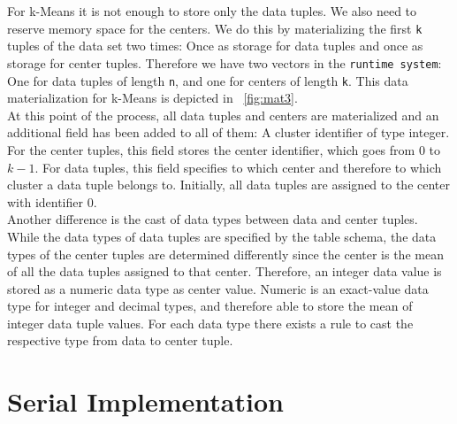 For k-Means it is not enough to store only the data tuples. We also need to reserve memory space for the centers. We do this by materializing the first \texttt{k} tuples of the data set two times: Once as storage for data tuples and once as storage for center tuples. Therefore we have two vectors in the \texttt{runtime system}: One for data tuples of length \texttt{n}, and one for centers of length \texttt{k}. This data materialization for k-Means is depicted in ~\autoref{fig:mat3}.
\\ 
At this point of the process, all data tuples and centers are materialized and an additional field has been added to all of them: A cluster identifier of type integer. For the center tuples, this field stores the center identifier, which goes from 0 to $k - 1$. For data tuples, this field specifies to which center and therefore to which cluster a data tuple belongs to. Initially, all data tuples are assigned to the center with identifier 0. 
\\
Another difference is the cast of data types between data and center tuples. While the data types of data tuples are specified by the table schema, the data types of the center tuples are determined differently since the center is the mean of all the data tuples assigned to that center. Therefore, an integer data value is stored as a numeric data type as center value. Numeric is an exact-value data type for integer and decimal types, and therefore able to store the mean of integer data tuple values. For each data type there exists a rule to cast the respective type from data to center tuple.


\FloatBarrier

\section{Serial Implementation}\label{section:serial_implementation}

